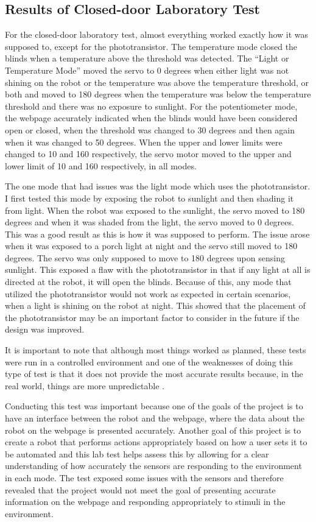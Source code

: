 \documentclass[10pt,twocolumn]{article}
\begin{document}
\subsection{Results of Closed-door Laboratory Test}
For the closed-door laboratory test, almost everything worked exactly how it was supposed to, except for the phototransistor. The temperature mode closed the blinds when a temperature above the threshold was detected. The “Light or Temperature Mode” moved the servo to 0 degrees when either light was not shining on the robot or the temperature was above the temperature threshold, or both and moved to 180 degrees when the temperature was below the temperature threshold and there was no exposure to sunlight. For the potentiometer mode, the webpage accurately indicated when the blinds would have been considered open or closed, when the threshold was changed to 30 degrees and then again when it was changed to 50 degrees. When the upper and lower limits were changed to 10 and 160 respectively, the servo motor moved to the upper and lower limit of 10 and 160 respectively, in all modes.

The one mode that had issues was the light mode which uses the phototransistor. I first tested this mode by exposing the robot to sunlight and then shading it from light. When the robot was exposed to the sunlight, the servo moved to 180 degrees and when it was shaded from the light, the servo moved to 0 degrees. This was a good result as this is how it was supposed to perform. The issue arose when it was exposed to a porch light at night and the servo still moved to 180 degrees. The servo was only supposed to move to 180 degrees upon sensing sunlight. This exposed a flaw with the phototransistor in that if any light at all is directed at the robot, it will open the blinds. Because of this, any mode that utilized the phototransistor would not work as expected in certain scenarios, when a light is shining on the robot at night. This showed that the placement of the phototransistor may be an important factor to consider in the future if the design was improved. 

It is important to note that although most things worked as planned, these tests were run in a controlled environment and one of the weaknesses of doing this type of test is that it does not provide the most accurate results because, in the real world, things are more unpredictable \cite{Muller2015Designing}.

Conducting this test was important because one of the goals of the project is to have an interface between the robot and the webpage, where the data about the robot on the webpage is presented accurately. Another goal of this project is to create a robot that performs actions appropriately based on how a user sets it to be automated and this lab test helps assess this by allowing for a clear understanding of how accurately the sensors are responding to the environment in each mode. The test exposed some issues with the sensors and therefore revealed that the project would not meet the goal of presenting accurate information on the webpage and responding appropriately to stimuli in the environment. 
\end{document}

